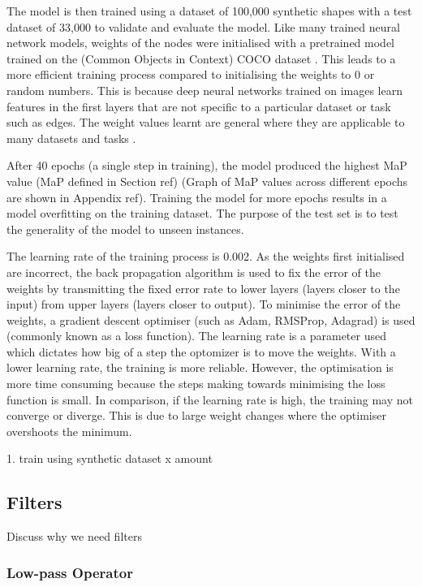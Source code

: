 The model is then trained using a dataset of 100,000 synthetic shapes with a test dataset of 33,000 to validate and evaluate the model. Like many trained neural network models, weights of the nodes were initialised with a pretrained model trained on the (Common Objects in Context) COCO dataset \cite{lin2014microsoft}. This leads to a more efficient training process compared to initialising the weights to 0 or random numbers. This is because deep neural networks trained on images learn features in the first layers that are not specific to a particular dataset or task such as edges. The weight values learnt are general where they are applicable to many datasets and tasks \cite{yosinski2014transferable}.

After 40 epochs (a single step in training), the model produced the highest MaP value (MaP defined in Section ref) (Graph of MaP values across different epochs are shown in Appendix ref). Training the model for more epochs results in a model overfitting on the training dataset. The purpose of the test set is to test the generality of the model to unseen instances.
 
The learning rate of the training process is 0.002. As the weights first initialised are incorrect, the back propagation algorithm is used to fix the error of the weights by transmitting the fixed error rate to lower layers (layers closer to the input) from upper layers (layers closer to output). To minimise the error of the weights, a gradient descent optimiser (such as Adam, RMSProp, Adagrad) is used (commonly known as a loss function). The learning rate is a parameter used which dictates how big of a step the optomizer is to move the weights. With a lower learning rate, the training is more reliable. However, the optimisation is more time consuming because the steps making towards minimising the loss function is small. In comparison, if the learning rate is high, the training may not converge or diverge. This is due to large weight changes where the optimiser overshoots the minimum.

1. train using synthetic dataset x amount


\subsection{Filters}
Discuss why we need filters
\subsubsection{Low-pass Operator}

